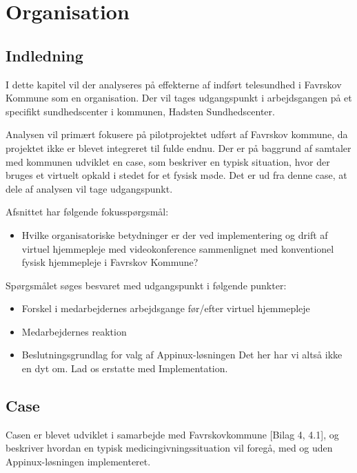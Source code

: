 \chapter{Organisation}

\section{Indledning}
I dette kapitel vil der analyseres på effekterne af indført telesundhed i Favrskov Kommune som en organisation. Der vil tages udgangspunkt i arbejdsgangen på et specifikt sundhedscenter i kommunen, Hadsten Sundhedscenter. 

Analysen vil primært fokusere på pilotprojektet udført af Favrskov kommune, da projektet ikke er blevet integreret til fulde endnu. Der er på baggrund af samtaler med kommunen udviklet en case, som beskriver en typisk situation, hvor der bruges et virtuelt opkald i stedet for et fysisk møde. Det er ud fra denne case, at dele af analysen vil tage udgangspunkt.

Afsnittet har følgende fokusspørgsmål:
\begin{itemize}
\item{Hvilke organisatoriske betydninger er der ved implementering og drift af virtuel hjemmepleje med videokonference sammenlignet med konventionel fysisk hjemmepleje i Favrskov Kommune?}
\end{itemize}
Spørgsmålet søges besvaret med udgangspunkt i følgende punkter:
\begin{itemize}
\item{Forskel i medarbejdernes arbejdsgange før/efter virtuel hjemmepleje}
\item{Medarbejdernes reaktion}
\item{Beslutningsgrundlag for valg af Appinux-løsningen Det her har vi altså ikke en dyt om. Lad os erstatte med Implementation.}
\end{itemize}

\section{Case}
Casen er blevet udviklet i samarbejde med Favrskovkommune [Bilag 4, 4.1], og beskriver hvordan en typisk medicingivningssituation vil foregå, med og uden Appinux-løsningen implementeret. 


